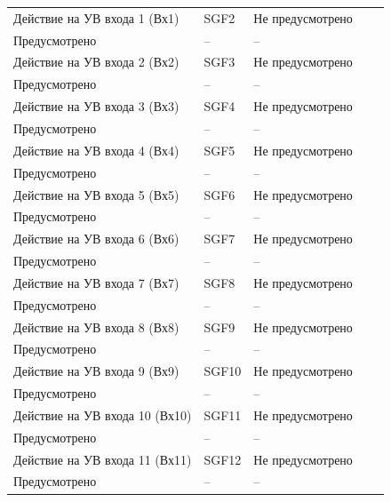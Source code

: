 \begin{longtable}{|>{\centering\arraybackslash}m{5.3cm}|>{\centering\arraybackslash}m{3.3cm}|>{\centering\arraybackslash}m{4.2cm}|>{\centering\arraybackslash}m{1.8cm}|>{\centering\arraybackslash}m{1cm}|}
\hline
\centering Действие на УВ входа 1 (Вх1)  & \centering SGF2 & \centering Не предусмотрено \\ Предусмотрено & \centering -- & \centering \arraybackslash -- \\
\hline
\centering Действие на УВ входа 2 (Вх2)  & \centering SGF3 & \centering Не предусмотрено \\ Предусмотрено & \centering -- & \centering \arraybackslash -- \\
\hline
\centering Действие на УВ входа 3 (Вх3)  & \centering SGF4 & \centering Не предусмотрено \\ Предусмотрено & \centering -- & \centering \arraybackslash -- \\
\hline
\centering Действие на УВ входа 4 (Вх4)  & \centering SGF5 & \centering Не предусмотрено \\ Предусмотрено & \centering -- & \centering \arraybackslash -- \\
\hline
\centering Действие на УВ входа 5 (Вх5)  & \centering SGF6 & \centering Не предусмотрено \\ Предусмотрено & \centering -- & \centering \arraybackslash -- \\
\hline
\centering Действие на УВ входа 6 (Вх6)  & \centering SGF7 & \centering Не предусмотрено \\ Предусмотрено & \centering -- & \centering \arraybackslash -- \\
\hline
\centering Действие на УВ входа 7 (Вх7)  & \centering SGF8 & \centering Не предусмотрено \\ Предусмотрено & \centering -- & \centering \arraybackslash -- \\
\hline
\centering Действие на УВ входа 8 (Вх8)  & \centering SGF9 & \centering Не предусмотрено \\ Предусмотрено & \centering -- & \centering \arraybackslash -- \\
\hline
\centering Действие на УВ входа 9 (Вх9)  & \centering SGF10 & \centering Не предусмотрено \\ Предусмотрено & \centering -- & \centering \arraybackslash -- \\
\hline
\centering Действие на УВ входа 10 (Вх10)  & \centering SGF11 & \centering Не предусмотрено \\ Предусмотрено & \centering -- & \centering \arraybackslash -- \\
\hline
\centering Действие на УВ входа 11 (Вх11)  & \centering SGF12 & \centering Не предусмотрено \\ Предусмотрено & \centering -- & \centering \arraybackslash -- \\

\end{longtable}
